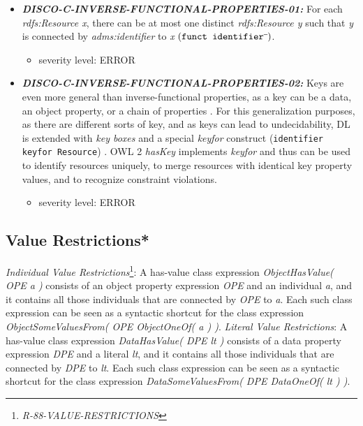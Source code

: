 \documentclass{llncs}
\newcommand{\ms}[1]{\texttt{#1}}
\begin{document}
\begin{itemize}
	\item \textbf{{\em DISCO-C-INVERSE-FUNCTIONAL-PROPERTIES-01:}}
	For each \emph{rdfs:Resource x}, there can be at most one distinct \emph{rdfs:Resource y} such that \emph{y} is connected by \emph{adms:identifier} to \emph{x} $(\ms{funct identifier}\sp{\overline{\ }})$.
	\begin{itemize}
		\item severity level: ERROR
	\end{itemize}
	\item \textbf{{\em DISCO-C-INVERSE-FUNCTIONAL-PROPERTIES-02:}}
	Keys are even more general than inverse-functional properties,
as a key can be a data, an object property, or a chain of properties \cite{Schneider2009}.
For this generalization purposes, as there are different sorts of key, and as keys can lead to undecidability, 
DL is extended with \emph{key boxes} and a special \emph{keyfor} construct (\ms{identifier \ms{keyfor} Resource}) \cite{Lutz2005}.
OWL 2 \emph{hasKey} implements \emph{keyfor} and thus can be used to identify resources uniquely, to merge resources with identical key property values, and to recognize constraint violations.
	\begin{itemize}
		\item severity level: ERROR
	\end{itemize}
\end{itemize}

\subsection{Value Restrictions*}

\emph{Individual Value Restrictions}\footnote{\emph{R-88-VALUE-RESTRICTIONS}}: A has-value class expression \emph{ObjectHasValue( OPE a )} consists of an object property expression \emph{OPE} and an individual \emph{a}, and it contains all those individuals that are connected by \emph{OPE} to \emph{a}. Each such class expression can be seen as a syntactic shortcut for the class expression \emph{ObjectSomeValuesFrom( OPE ObjectOneOf( a ) )}. 
\emph{Literal Value Restrictions}: A has-value class expression \emph{DataHasValue( DPE lt )} consists of a data property expression \emph{DPE} and a literal \emph{lt}, and it contains all those individuals that are connected by \emph{DPE} to \emph{lt}. Each such class expression can be seen as a syntactic shortcut for the class expression \emph{DataSomeValuesFrom( DPE DataOneOf( lt ) )}.
\end{document}
